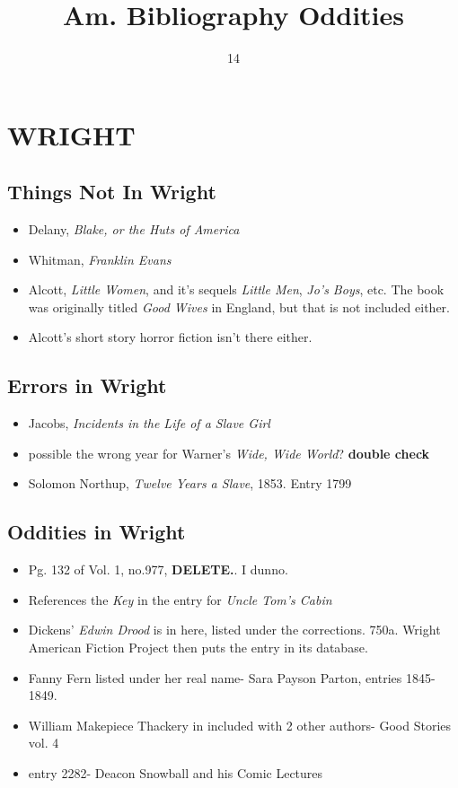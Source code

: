 \documentclass[course, english]{Notes}
\title{Am. Bibliography Oddities}
\date{14}{04}{2017}
\begin{document}
\section{WRIGHT}
\subsection{Things Not In Wright}
\begin{itemize}
\item{Delany, \textit{Blake, or the Huts of America}}
\item{Whitman, \textit{Franklin Evans}}
\item{Alcott, \textit{Little Women}, and it's sequels \textit{Little Men}, \textit{Jo's Boys}, etc.} The book was originally titled \textit{Good Wives} in England, but that is not included either.
\item{Alcott's short story horror fiction isn't there either.}

\end{itemize}

\subsection{Errors in Wright}
\begin{itemize}

\item{ Jacobs, \textit{Incidents in the Life of a Slave Girl}}
\item{ possible the wrong year for Warner's \textit{Wide, Wide World}? \textbf{double check}}
\item Solomon Northup, \textit{Twelve Years a Slave}, 1853. Entry 1799
\end{itemize}

\subsection{Oddities in Wright}
\begin{itemize}

\item{ Pg. 132 of Vol. 1, no.977, \textbf{DELETE.}. I dunno.}
\item{ References the \textit{Key} in the entry for \textit{Uncle Tom's Cabin}}
\item Dickens' \textit{Edwin Drood} is in here, listed under the corrections. 750a. Wright American Fiction Project then puts the entry in its database. 
\item Fanny Fern listed under her real name- Sara Payson Parton, entries 1845-1849.
\item William Makepiece Thackery in included with 2 other authors- Good Stories vol. 4
\item entry 2282- Deacon Snowball and his Comic Lectures
\end{itemize}
\end{document}
